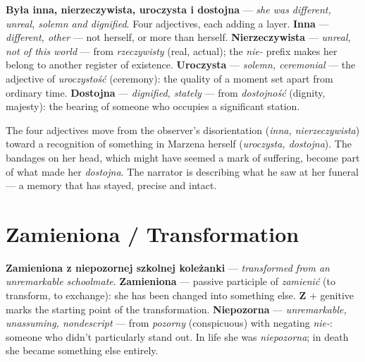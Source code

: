 \textbf{Była inna, nierzeczywista, uroczysta i dostojna} ---
\textit{she was different, unreal, solemn and dignified}. Four
adjectives, each adding a layer. \textbf{Inna} ---
\textit{different, other} --- not herself, or more than herself.
\textbf{Nierzeczywista} --- \textit{unreal, not of this world}
--- from \textit{rzeczywisty} (real, actual); the \textit{nie-}
prefix makes her belong to another register of existence.
\textbf{Uroczysta} --- \textit{solemn, ceremonial} --- the
adjective of \textit{uroczystość} (ceremony): the quality of a
moment set apart from ordinary time. \textbf{Dostojna} ---
\textit{dignified, stately} --- from \textit{dostojność}
(dignity, majesty): the bearing of someone who occupies a
significant station.

\medskip
The four adjectives move from the observer's disorientation
(\textit{inna, nierzeczywista}) toward a recognition of something
in Marzena herself (\textit{uroczysta, dostojna}). The bandages
on her head, which might have seemed a mark of suffering, become
part of what made her \textit{dostojna}. The narrator is
describing what he saw at her funeral --- a memory that has
stayed, precise and intact.

\section{Zamieniona / Transformation}



\textbf{Zamieniona z niepozornej szkolnej koleżanki} ---
\textit{transformed from an unremarkable schoolmate}.
\textbf{Zamieniona} --- passive participle of \textit{zamienić}
(to transform, to exchange): she has been changed into something
else. \textbf{Z} + genitive marks the starting point of the
transformation. \textbf{Niepozorna} --- \textit{unremarkable,
unassuming, nondescript} --- from \textit{pozorny} (conspicuous)
with negating \textit{nie-}: someone who didn't particularly
stand out. In life she was \textit{niepozorna}; in death she
became something else entirely.

